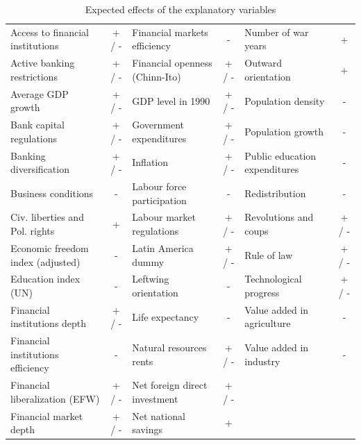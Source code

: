 \documentclass[a4paper,11pt]{article}
\begin{document}
\begin{landscape}
\centering
\setlength\tabcolsep{6pt}
\begin{table}	
\footnotesize
\caption{Expected effects of the explanatory variables}
\label{tab:exp_eff}
\begin{tabular}{lc|lc|lc}
  \toprule
  Access to financial institutions & + / - & Financial markets efficiency 	& - 	& Number of war years & +			\\ 
  Active banking restrictions 	   & + / - & Financial openness (Chinn-Ito) & + / - & Outward orientation & + 			\\ 
  Average GDP growth 			   & + / - & GDP level in 1990 				& + / - & Population density & - 			\\ 
  Bank capital regulations 		   & + / - & Government expenditures 		& + / - & Population growth & -  			\\ 
  Banking diversification 		   & + / - & Inflation 						& + / - & Public education expenditures & - \\ 
  Business conditions 			   & - 	   & Labour force participation 	& - 	& Redistribution & - 				\\ 
  Civ. liberties and Pol. rights   & + 	   & Labour market regulations 		& + / - & Revolutions and coups & + / - 	\\ 
  Economic freedom index (adjusted) & -    & Latin America dummy			& + / - & Rule of law & + / - 				\\ 
  Education index (UN) 			   & - 	   & Leftwing orientation			& - 	& Technological progress & + / - 	\\ 
  Financial institutions depth 	   & + / - & Life expectancy 				& - 	& Value added in agriculture & - 	\\ 
  Financial institutions efficiency & -    & Natural resources rents 		& + / - & Value added in industry & - 		\\ 
  Financial liberalization (EFW)   & + / - & Net foreign direct investment  & + / - & 									\\ 
  Financial market depth 		   & + / - & Net national savings 			& + 	& 									\\ 
   \bottomrule
\end{tabular}
\end{table}
\end{landscape}
\clearpage

%
%
\restoregeometry
\end{document}
